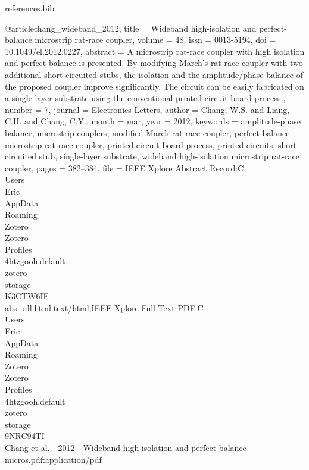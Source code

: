 \begin{filecontents*}{references.bib}

@article{chang_wideband_2012,
	title = {Wideband high-isolation and perfect-balance microstrip rat-race coupler},
	volume = {48},
	issn = {0013-5194},
	doi = {10.1049/el.2012.0227},
	abstract = {A microstrip rat-race coupler with high isolation and perfect balance is presented. By modifying March's rat-race coupler with two additional short-circuited stubs, the isolation and the amplitude/phase balance of the proposed coupler improve significantly. The circuit can be easily fabricated on a single-layer substrate using the conventional printed circuit board process.},
	number = {7},
	journal = {Electronics Letters},
	author = {Chang, W.S. and Liang, C.H. and Chang, C.Y.},
	month = mar,
	year = {2012},
	keywords = {amplitude-phase balance, microstrip couplers, modified March rat-race coupler, perfect-balance microstrip rat-race coupler, printed circuit board process, printed circuits, short-circuited stub, single-layer substrate, wideband high-isolation microstrip rat-race coupler},
	pages = {382--384},
	file = {IEEE Xplore Abstract Record:C\:\\Users\\Eric\\AppData\\Roaming\\Zotero\\Zotero\\Profiles\\4htzgooh.default\\zotero\\storage\\K3CTW6IF\\abs_all.html:text/html;IEEE Xplore Full Text PDF:C\:\\Users\\Eric\\AppData\\Roaming\\Zotero\\Zotero\\Profiles\\4htzgooh.default\\zotero\\storage\\9NRC94TI\\Chang et al. - 2012 - Wideband high-isolation and perfect-balance micros.pdf:application/pdf}
}


\end{filecontents*}
